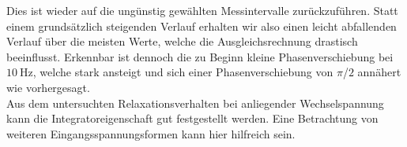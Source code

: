 Dies ist wieder auf die ungünstig gewählten Messintervalle zurückzuführen. Statt einem grundsätzlich steigenden Verlauf erhalten wir also einen leicht abfallenden Verlauf über die meisten Werte, welche die 
Ausgleichsrechnung drastisch beeinflusst. Erkennbar ist dennoch die zu Beginn kleine Phasenverschiebung bei $\SI{10}{\hertz}$, welche stark ansteigt und sich einer
Phasenverschiebung von $\pi$/$2$ annähert wie vorhergesagt.
\\
\newline
Aus dem untersuchten Relaxationsverhalten bei anliegender Wechselspannung kann die Integratoreigenschaft gut festgestellt werden. Eine Betrachtung von weiteren Eingangsspannungsformen
kann hier hilfreich sein.